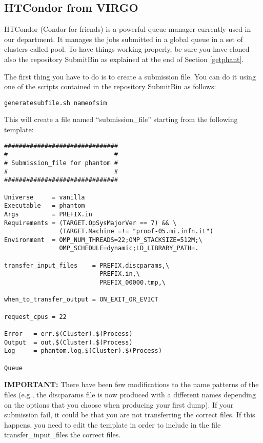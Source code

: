 \documentclass[10pt,a4paper,twoside]{article} %
\begin{document}
\subsection{HTCondor from VIRGO}\label{condvirgo}

HTCondor (Condor for friends) is a powerful queue manager currently used in our department. It manages the jobs submitted in a global queue in a set of clusters called pool. To have things working properly, be sure you have cloned also the repository SubmitBin as explained at the end of Section \ref{getphant}.

The first thing you have to do is to create a submission file. You can do it using one of the scripts contained in the repository SubmitBin as follows:
\begin{verbatim}
generatesubfile.sh nameofsim
\end{verbatim}
This will create a file named ``submission\_file'' starting from the following template:
\begin{verbatim}
###############################
#                             #
# Submission_file for phantom #
#                             #
###############################

Universe     = vanilla
Executable   = phantom
Args         = PREFIX.in
Requirements = (TARGET.OpSysMajorVer == 7) && \
               (TARGET.Machine =!= "proof-05.mi.infn.it")
Environment  = OMP_NUM_THREADS=22;OMP_STACKSIZE=512M;\
               OMP_SCHEDULE=dynamic;LD_LIBRARY_PATH=.

transfer_input_files    = PREFIX.discparams,\
                          PREFIX.in,\
                          PREFIX_00000.tmp,\

when_to_transfer_output = ON_EXIT_OR_EVICT

request_cpus = 22

Error   = err.$(Cluster).$(Process)
Output  = out.$(Cluster).$(Process)
Log     = phantom.log.$(Cluster).$(Process)

Queue
\end{verbatim}
\textbf{IMPORTANT:} There have been few modifications to the name patterns of the files (e.g., the discparams file is now produced with a different names depending on the options that you choose when producing your first dump). If your submission fail, it could be that you are not transferring the correct files. If this happens, you need to edit the template in order to include in the file transfer\_input\_files the correct files.
\end{document}
